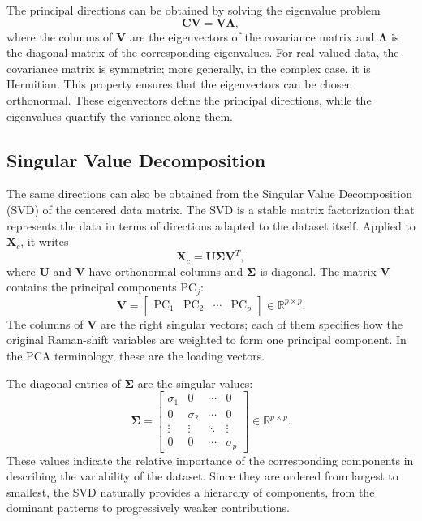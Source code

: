 The principal directions can be obtained by solving the eigenvalue problem
\begin{equation}
    \mathbf{C}\mathbf{V} =
    \mathbf{V}\boldsymbol{\Lambda},
    \label{eq:pca_covariance_eigendecomposition}
\end{equation}
where the columns of \(\mathbf{V}\) are the eigenvectors of the covariance matrix and
\(\boldsymbol{\Lambda}\) is the diagonal matrix of the corresponding eigenvalues.
For real-valued data, the covariance matrix is symmetric; more generally, in the complex
case, it is Hermitian. This property ensures that the eigenvectors can be chosen
orthonormal. These eigenvectors define the principal directions, while the eigenvalues
quantify the variance along them. 

\subsection{Singular Value Decomposition}
\label{subsec:pca_svd}

The same directions can also be obtained from the Singular Value Decomposition (SVD) of the centered data matrix. The SVD is a stable
matrix factorization that represents the data in terms of directions adapted to the dataset
itself. Applied to \(\mathbf{X}_c\), it writes
\begin{equation}
    \mathbf{X}_c =
    \mathbf{U}\boldsymbol{\Sigma}\mathbf{V}^{T},
    \label{eq:pca_svd}
\end{equation}
where \(\mathbf{U}\) and \(\mathbf{V}\) have orthonormal columns and
\(\boldsymbol{\Sigma}\) is diagonal.  
The matrix \(\mathbf{V}\) contains the principal components \(\mathrm{PC}_j\):
\begin{equation}
    \mathbf{V} =
    \begin{bmatrix}
    \mathrm{PC}_1 & \mathrm{PC}_2 & \cdots & \mathrm{PC}_p
    \end{bmatrix}
    \in \mathbb{R}^{p \times p}.
    \label{eq:pca_v_matrix}
\end{equation}
 The columns of
\(\mathbf{V}\) are the right singular vectors; each of them specifies
how the original Raman-shift variables are weighted to form one principal component.
In the PCA terminology, these are the loading vectors.

The diagonal entries of \(\boldsymbol{\Sigma}\) are the singular values:
\begin{equation}
    \boldsymbol{\Sigma} =
    \begin{bmatrix}
    \sigma_1 & 0 & \cdots & 0 \\
    0 & \sigma_2 & \cdots & 0 \\
    \vdots & \vdots & \ddots & \vdots \\
    0 & 0 & \cdots & \sigma_p
    \end{bmatrix}
    \in \mathbb{R}^{p \times p}.
    \label{eq:pca_sigma_matrix}
\end{equation}
These values indicate the relative importance of the corresponding components in
describing the variability of the dataset. Since they are ordered from largest to smallest,
the SVD naturally provides a hierarchy of components, from the dominant patterns to
progressively weaker contributions.

